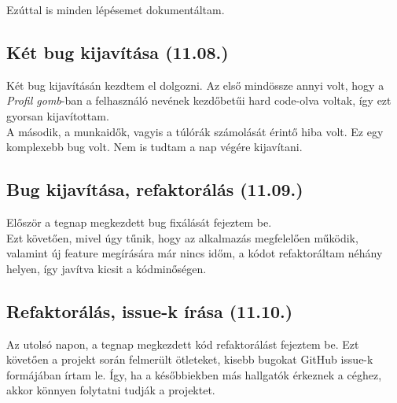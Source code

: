\documentclass[a4paper]{article}
\begin{document}
Ezúttal is minden lépésemet dokumentáltam.

\subsection{Két bug kijavítása (11.08.)}

Két bug kijavításán kezdtem el dolgozni. Az első mindössze annyi volt, hogy a \emph{Profil gomb}-ban a
felhasználó nevének kezdőbetűi hard code-olva voltak, így ezt gyorsan kijavítottam.\\

A második, a munkaidők, vagyis a túlórák számolását érintő hiba volt. Ez egy komplexebb bug volt.
Nem is tudtam a nap végére kijavítani.

\subsection{Bug kijavítása, refaktorálás (11.09.)}

Először a tegnap megkezdett bug fixálását fejeztem be.\\

Ezt követően, mivel úgy tűnik, hogy az alkalmazás megfelelően működik, valamint új feature
megírására már nincs időm, a kódot refaktoráltam néhány helyen, így javítva kicsit a kódminőségen.

\subsection{Refaktorálás, issue-k írása (11.10.)}

Az utolsó napon, a tegnap megkezdett kód refaktorálást fejeztem be. Ezt követően a projekt során
felmerült ötleteket, kisebb bugokat GitHub issue-k formájában írtam le. Így, ha a későbbiekben más
hallgatók érkeznek a céghez, akkor könnyen folytatni tudják a projektet.



\end{document}
